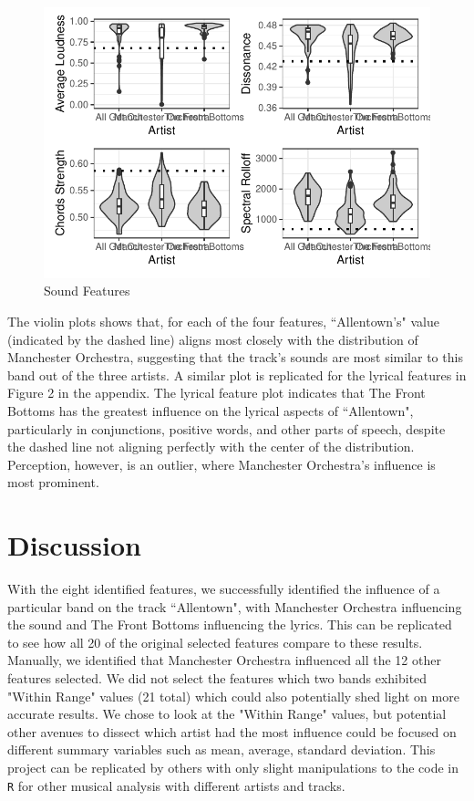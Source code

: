 \documentclass{article}\usepackage[]{graphicx}\usepackage[]{xcolor}
\makeatletter
\def\maxwidth{ %
  \ifdim\Gin@nat@width>\linewidth
    \linewidth
  \else
    \Gin@nat@width
  \fi
}
\newenvironment{knitrout}{}{} %
\makeatother
\begin{document}
\begin{multicols}{2}
\begin{figure}[H]
\begin{center}
\begin{knitrout}
\color{fgcolor}
\includegraphics[width=\maxwidth]{figure/unnamed-chunk-3-1} 
\end{knitrout}
\caption{Sound Features}
\label{sound} 
\end{center}
\end{figure}
The violin plots shows that, for each of the four features, ``Allentown’s" value (indicated by the dashed line) aligns most closely with the distribution of Manchester Orchestra, suggesting that the track’s sounds are most similar to this band out of the three artists. A similar plot is replicated for the lyrical features in Figure 2 in the appendix. The lyrical feature plot indicates that The Front Bottoms has the greatest influence on the lyrical aspects of ``Allentown", particularly in conjunctions, positive words, and other parts of speech, despite the dashed line not aligning perfectly with the center of the distribution. Perception, however, is an outlier, where Manchester Orchestra’s influence is most prominent.

\section{Discussion}
With the eight identified features, we successfully identified the influence of a particular band on the track ``Allentown", with Manchester Orchestra influencing the sound and The Front Bottoms influencing the lyrics. This can be replicated to see how all 20 of the original selected features compare to these results. Manually, we identified that Manchester Orchestra influenced all the 12 other features selected. We did not select the features which two bands exhibited "Within Range" values (21 total) which could also potentially shed light on more accurate results. We chose to look at the "Within Range" values, but potential other avenues to dissect which artist had the most influence could be focused on different summary variables such as mean, average, standard deviation. This project can be replicated by others with only slight manipulations to the code in \texttt{R} for other musical analysis with different artists and tracks. 



\end{multicols}
\end{document}
